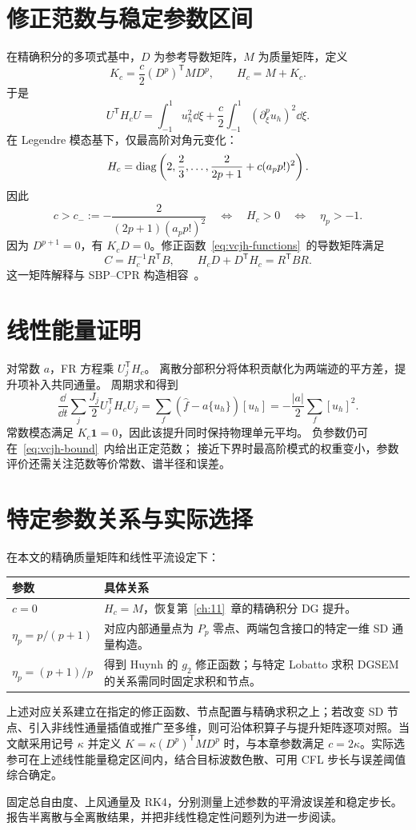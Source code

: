 \section{修正范数与稳定参数区间}
在精确积分的多项式基中，$D$ 为参考导数矩阵，$M$ 为质量矩阵，定义
\begin{equation}\label{eq:vcjh-norm}
K_c=\frac c2(D^p)^{\mathsf T}MD^p,\qquad H_c=M+K_c.
\end{equation}
于是
\[
U^{\mathsf T}H_cU
=\int_{-1}^1u_h^2\dd\xi
+\frac c2\int_{-1}^1(\partial_\xi^pu_h)^2\dd\xi.
\]
在 Legendre 模态基下，仅最高阶对角元变化：
\[
H_c=\operatorname{diag}\left(2,\frac23,\ldots,
\frac{2}{2p+1}+c(a_pp!)^2\right).
\]
因此
\begin{equation}\label{eq:vcjh-bound}
c>c_-:=-\frac{2}{(2p+1)(a_pp!)^2}
\quad\Longleftrightarrow\quad H_c>0
\quad\Longleftrightarrow\quad\eta_p>-1.
\end{equation}
因为 $D^{p+1}=0$，有 $K_cD=0$。修正函数~\eqref{eq:vcjh-functions}~的导数矩阵满足
\[
C=H_c^{-1}R^{\mathsf T}B,\qquad
H_cD+D^{\mathsf T}H_c=R^{\mathsf T}BR.
\]
这一矩阵解释与 SBP--CPR 构造相容~\cite{ranocha2016}。

\section{线性能量证明}
对常数 $a$，FR 方程乘 $U_j^{\mathsf T}H_c$。
离散分部积分将体积贡献化为两端迹的平方差，提升项补入共同通量。
周期求和得到
\[
\frac{\dd}{\dd t}\sum_j\frac{J_j}{2}U_j^{\mathsf T}H_cU_j
=\sum_f(\widehat f-a\{u_h\})[u_h]
=-\frac{|a|}{2}\sum_f[u_h]^2.
\]
常数模态满足 $K_c\bm1=0$，因此该提升同时保持物理单元平均。
负参数仍可在~\eqref{eq:vcjh-bound}~内给出正定范数；
接近下界时最高阶模式的权重变小，参数评价还需关注范数等价常数、谱半径和误差。

\section{特定参数关系与实际选择}
在本文的精确质量矩阵和线性平流设定下：
\begin{center}\small
\begin{tabularx}{\textwidth}{@{}l>{\raggedright\arraybackslash}X@{}}
\toprule
参数 & 具体关系\\
\midrule
$c=0$ & $H_c=M$，恢复第~\ref{ch:11}~章的精确积分 DG 提升。\\
$\eta_p=p/(p+1)$ & 对应内部通量点为 $P_p$ 零点、两端包含接口的特定一维 SD 通量构造。\\
$\eta_p=(p+1)/p$ & 得到 Huynh 的 $g_2$ 修正函数；与特定 Lobatto 求积 DGSEM 的关系需同时固定求积和节点。\\
\bottomrule
\end{tabularx}
\end{center}
上述对应关系建立在指定的修正函数、节点配置与精确求积之上；若改变 SD 节点、引入非线性通量插值或推广至多维，则可沿体积算子与提升矩阵逐项对照。当文献采用记号 $\kappa$ 并定义 $K=\kappa(D^p)^{\mathsf T}MD^p$ 时，与本章参数满足 $c=2\kappa$。实际选参可在上述线性能量稳定区间内，结合目标波数色散、可用 CFL 步长与误差阈值综合确定。

{固定总自由度、上风通量及 RK4，分别测量上述参数的平滑波误差和稳定步长。报告半离散与全离散结果，并把非线性稳定性问题列为进一步阅读。}
